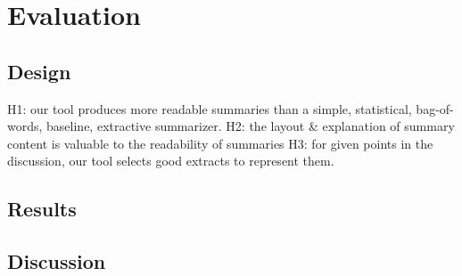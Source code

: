 \chapter{Evaluation\label{chap:evaluation}}
  \section{Design}
    H1: our tool produces more readable summaries than a simple, statistical, bag-of-words, baseline, extractive summarizer.
    H2: the layout \& explanation of summary content is valuable to the readability of summaries
    H3: for given points in the discussion, our tool selects good extracts to represent them.
  \section{Results}
  \section{Discussion}

